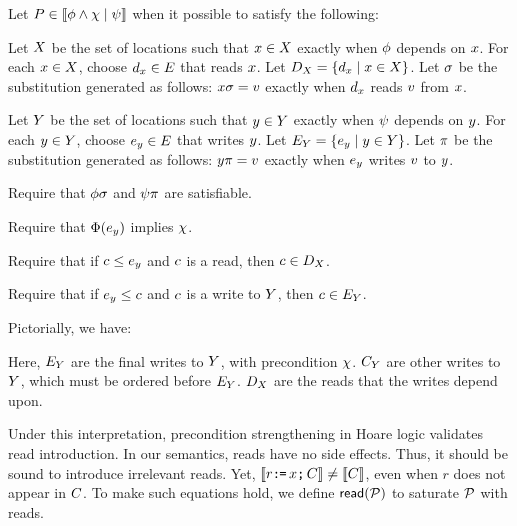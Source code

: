 \begin{definition}
  \label{def:prepost}
  Let $P\in\llbracket\phi\land\chi\mid\psi\rrbracket$
  when it possible to satisfy the following:

  Let $X$ be the set of locations such that $x\in X$ exactly
  when $\phi$ depends on $x$.  For each $x\in X$, choose
  $d_x\in E$ that reads $x$.
  Let $D_X=\{d_x\mid x\in X\}$.
  Let $\sigma$ be the substitution generated %
  as follows:
  $x\sigma = v$ exactly when $d_x$ reads $v$ from $x$.

  Let $Y$ be the set of locations such that $y\in Y$ exactly
  when $\psi$ depends on $y$.  For each $y\in Y$, choose
  $e_y\in E$ that writes $y$.
  Let $E_Y=\{e_y\mid y\in Y\}$.
  Let $\pi$ be the substitution generated %
  as follows:
  $y\pi = v$ exactly when $e_y$ writes $v$ to $y$.

  Require that $\phi\sigma$ and $\psi\pi$ are satisfiable.

  Require that $\Phi(e_y)$ implies $\chi$.
  
  Require that if $c\le e_y$ and $c$ is a read, then $c\in D_X$.

  Require that if $e_y\le c$ and $c$ is a write to $Y$, then $c\in E_Y$.
\end{definition}
Pictorially, we have:
\begin{tikzdisplay}[node distance=.1ex and 2em]
\end{tikzdisplay}
Here, $E_Y$ are the final writes to $Y$, with precondition $\chi$.
$C_Y$ are other writes to $Y$, which must be ordered before $E_Y$.
$D_X$ are the reads that the writes depend upon.

Under this interpretation, precondition strengthening in Hoare logic
validates read introduction.  In our semantics, reads have no side effects.
Thus, it should be sound to introduce irrelevant reads.  Yet,
$\llbracket r\texttt{:}\mkern-1mu\texttt{=}\, x\texttt{;}\,\allowbreak C\rrbracket\neq \llbracket C\rrbracket$, even when $r$ does not appear in
$C$.  To make such equations hold, we define ${\mathsf{read}}(\mathcal{P})$ to saturate
$\mathcal{P}$ with reads.

